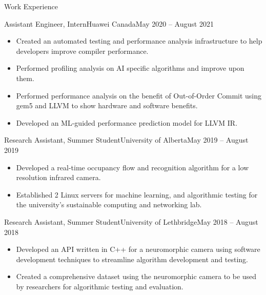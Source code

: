 \documentclass[]{mcdowellcv}
\begin{document}
\vspace*{-10pt}
\begin{cvsection}{Work Experience}
   \begin{cvsubsection}{Assistant Engineer, Intern}{Huawei Canada}{May 2020 -- August 2021}
    \begin{itemize}
      \item Created an automated testing and performance analysis infrastructure to help developers improve compiler performance.
      \item Performed profiling analysis on AI specific algorithms and improve upon them.
      \item Performed performance analysis on the benefit of Out-of-Order Commit using gem5 and LLVM to show hardware and software benefits.
      \item Developed an ML-guided performance prediction model for LLVM IR.
    \end{itemize}
  \end{cvsubsection}
  
  \begin{cvsubsection}{Research Assistant, Summer Student}{University of Alberta}{May 2019 -- August 2019}
    \vspace*{8pt}		
    \begin{itemize}
      \item Developed a real-time occupancy flow and recognition algorithm for a low resolution infrared camera.
      \item Established 2 Linux servers for machine learning, and algorithmic testing for the university's sustainable computing and networking lab.
    \end{itemize}
  \end{cvsubsection}
 
  \begin{cvsubsection}{Research Assistant, Summer Student}{University of Lethbridge}{May 2018 -- August 2018}	
    \vspace*{8pt}
    \begin{itemize}
      \item Developed an API written in C++ for a neuromorphic camera using software development techniques to streamline algorithm development and testing.
      \item Created a comprehensive dataset using the neuromorphic camera to be used by researchers for algorithmic testing and evaluation.
    \end{itemize}
  \end{cvsubsection}
\end{cvsection}
\end{document}
